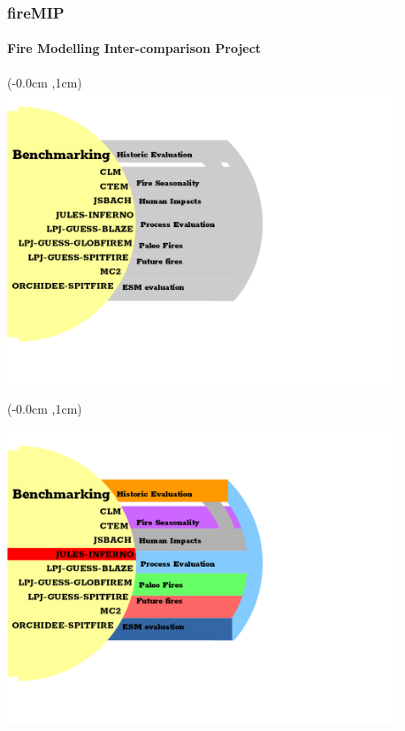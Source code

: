\begin{frame}[label = intro]
	\frametitle{fireMIP}
	\framesubtitle{Fire Modelling Inter-comparison Project}
	\begin{textblock*}{14cm}(-0.0cm ,1cm)
		\only<2-> {\includegraphics[width=11.7cm]{images/fireMIP/pp-grey.png}}
	\end{textblock*}
	\begin{textblock*}{14cm}(-0.0cm ,1cm)
	
				\includegraphics[width=11.7cm]{images/fireMIP/pp5.png}
			

\end{textblock*}
\end{frame}
